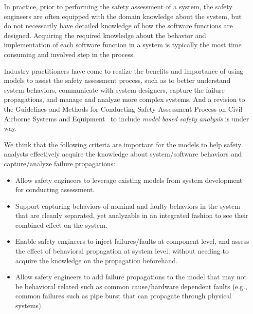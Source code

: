 {In practice, prior to performing the safety assessment of a system, the safety engineers are often equipped with the domain knowledge about the system, but do not necessarily have detailed knowledge of how the software functions are designed. Acquiring the required knowledge about the behavior and implementation of each software function in a system is typically the most time consuming and involved step in the process.

Industry practitioners have come to realize the benefits and importance of
using models to assist the safety assessment process, such as to better understand system behaviors, communicate with system designers, capture the failure propagations, and manage and analyze more complex systems. And a revision to the Guidelines and Methods for Conducting Safety Assessment Process on Civil Airborne Systems and Equipment~\cite{SAE:ARP4761} to include {\em model based safety analysis} is under way.


We think that the following criteria are important for the models to help safety analysts effectively acquire the knowledge about system/software behaviors and capture/analyze failure propagations:

\begin{itemize}
	\item Allow safety engineers to leverage existing models from system development for conducting assessment. %
	\item Support capturing behaviors of nominal and faulty behaviors in the system that are cleanly separated, yet analyzable in an integrated fashion to see their combined effect on the system.
	\item Enable safety engineers to inject failures/faults at component level, and assess the effect of behavioral propagation at system level, without needing to acquire the knowledge on the propagation beforehand. 
	\item Allow safety engineers to add failure propagations to the model that may not be behavioral related such as common cause/hardware dependent faults (e.g., common failures such as pipe burst that can propagate through physical systems).
\end{itemize}

}
